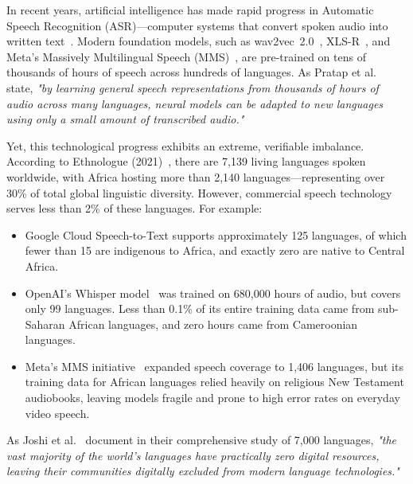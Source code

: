 \documentclass[a4paper,11pt]{article}
\begin{document}
In recent years, artificial intelligence has made rapid progress in Automatic Speech Recognition (ASR)—computer systems that convert spoken audio into written text~\cite{amodei2016deep, dong2018speech}. Modern foundation models, such as wav2vec~2.0~\cite{baevski2020wav2vec}, XLS-R~\cite{babu2022xlsr}, and Meta's Massively Multilingual Speech (MMS)~\cite{pratap2024scaling}, are pre-trained on tens of thousands of hours of speech across hundreds of languages. As Pratap et al.~\cite{pratap2024scaling} state, \textit{"by learning general speech representations from thousands of hours of audio across many languages, neural models can be adapted to new languages using only a small amount of transcribed audio."}

Yet, this technological progress exhibits an extreme, verifiable imbalance. According to Ethnologue (2021)~\cite{eberhard2021ethnologue}, there are 7,139 living languages spoken worldwide, with Africa hosting more than 2,140 languages—representing over 30\% of total global linguistic diversity. However, commercial speech technology serves less than 2\% of these languages. For example:
\begin{itemize}
    \item Google Cloud Speech-to-Text supports approximately 125 languages, of which fewer than 15 are indigenous to Africa, and exactly zero are native to Central Africa.
    \item OpenAI's Whisper model~\cite{radford2023robust} was trained on 680,000 hours of audio, but covers only 99 languages. Less than 0.1\% of its entire training data came from sub-Saharan African languages, and zero hours came from Cameroonian languages.
    \item Meta's MMS initiative~\cite{pratap2024scaling} expanded speech coverage to 1,406 languages, but its training data for African languages relied heavily on religious New Testament audiobooks, leaving models fragile and prone to high error rates on everyday video speech.
\end{itemize}

As Joshi et al.~\cite{joshi2020state} document in their comprehensive study of 7,000 languages, \textit{"the vast majority of the world's languages have practically zero digital resources, leaving their communities digitally excluded from modern language technologies."}
\end{document}
